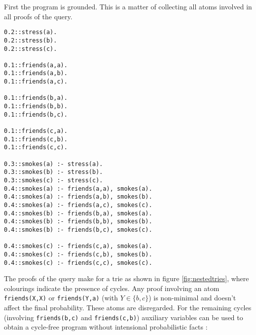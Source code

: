 


First the program is grounded. This is a matter of collecting all atoms involved in all proofs of the query.

\begin{code}
\begin{verbatim}
0.2::stress(a).
0.2::stress(b).
0.2::stress(c).

0.1::friends(a,a).
0.1::friends(a,b).
0.1::friends(a,c).

0.1::friends(b,a).
0.1::friends(b,b).
0.1::friends(b,c).

0.1::friends(c,a).
0.1::friends(c,b).
0.1::friends(c,c).

0.3::smokes(a) :- stress(a).
0.3::smokes(b) :- stress(b).
0.3::smokes(c) :- stress(c).
0.4::smokes(a) :- friends(a,a), smokes(a).
0.4::smokes(a) :- friends(a,b), smokes(b).
0.4::smokes(a) :- friends(a,c), smokes(c).
0.4::smokes(b) :- friends(b,a), smokes(a).
0.4::smokes(b) :- friends(b,b), smokes(b).
0.4::smokes(b) :- friends(b,c), smokes(c).

0.4::smokes(c) :- friends(c,a), smokes(a).
0.4::smokes(c) :- friends(c,b), smokes(b).
0.4::smokes(c) :- friends(c,c), smokes(c).
\end{verbatim}
\label{code:base}
\vspace{0.5cm}
\end{code}

\noindent The proofs of the query make for a trie as shown in figure \ref{fig:nestedtries}, where colourings indicate the presence of cycles. Any proof involving an atom \texttt{friends(X,X)} or \texttt{friends(Y,a)} (with $Y\in\{b,c\}$) is non-minimal and doesn't affect the final probability. These atoms are disregarded. For the remaining cycles (involving \texttt{friends(b,c)} and \texttt{friends(c,b)}) auxiliary variables can be used to obtain a cycle-free program without intensional probabilistic facts :

